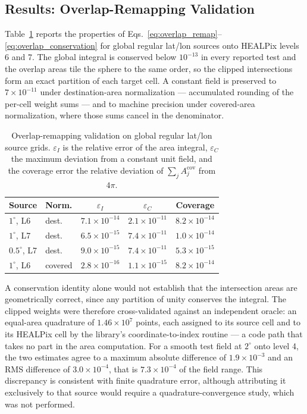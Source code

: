 \documentclass[journal]{IEEEtran}
\newcommand{\healpix}{HEALPix\xspace}
\begin{document}
\subsection{Results: Overlap-Remapping Validation}
\label{sec:overlap_results}

Table~\ref{tab:overlap_validation} reports the properties of
Eqs.~\eqref{eq:overlap_remap}--\eqref{eq:overlap_conservation} for
global regular lat/lon sources onto \healpix levels 6 and 7. The
global integral is conserved below $10^{-13}$ in every reported
test and the overlap areas tile the sphere to the same order, so the clipped
intersections form an exact partition of each target cell. A
constant field is preserved to $7\times10^{-11}$ under
destination-area normalization --- accumulated rounding of the
per-cell weight sums --- and to machine precision under
covered-area normalization, where those sums cancel in the
denominator.

\begin{table}[t]
\centering
\caption{Overlap-remapping validation on global regular lat/lon
source grids. $\varepsilon_I$ is the relative error of the
area integral, $\varepsilon_C$ the maximum deviation from a
constant unit field, and the coverage error the relative
deviation of $\sum_j A_j^{\mathrm{cov}}$ from $4\pi$.}
\label{tab:overlap_validation}
\footnotesize
\begin{tabular}{@{}llccc@{}}
\toprule
Source & Norm. & $\varepsilon_I$ & $\varepsilon_C$ & Coverage \\
\midrule
$1^\circ$, L6   & dest.    & $7.1\times10^{-14}$ & $2.1\times10^{-11}$ & $8.2\times10^{-14}$ \\
$1^\circ$, L7   & dest.    & $6.5\times10^{-15}$ & $7.4\times10^{-11}$ & $1.0\times10^{-14}$ \\
$0.5^\circ$, L7 & dest.    & $9.0\times10^{-15}$ & $7.4\times10^{-11}$ & $5.3\times10^{-15}$ \\
$1^\circ$, L6   & covered  & $2.8\times10^{-16}$ & $1.1\times10^{-15}$ & $8.2\times10^{-14}$ \\
\bottomrule
\end{tabular}
\end{table}

A conservation identity alone would not establish that the
intersection areas are geometrically correct, since any partition
of unity conserves the integral. The clipped weights were
therefore cross-validated against an independent oracle: an
equal-area quadrature of $1.46\times10^{7}$ points, each assigned
to its source cell and to its \healpix cell by the library's
coordinate-to-index routine --- a code path that takes no part in
the area computation. For a smooth test field at $2^\circ$ onto
level 4, the two estimates agree to a maximum absolute difference
of $1.9\times10^{-3}$ and an RMS difference of
$3.0\times10^{-4}$, that is $7.3\times10^{-4}$ of the field range.
This discrepancy is consistent with finite quadrature error,
although attributing it exclusively to that source would require a
quadrature-convergence study, which was not performed.
\end{document}
